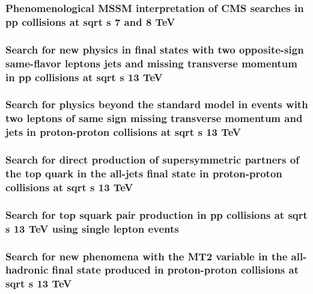 \documentclass[a4paper, 11pt, twoside, openright]{report}
\begin{document}
\subsubsection{Phenomenological MSSM interpretation of CMS searches in pp collisions at sqrt s 7 and 8 TeV}
%
\subsubsection{Search for new physics in final states with two opposite-sign same-flavor leptons jets and missing transverse momentum in pp collisions at sqrt s 13 TeV}
%
\subsubsection{Search for physics beyond the standard model in events with two leptons of same sign missing transverse momentum and jets in proton-proton collisions at sqrt s 13 TeV}
%
\subsubsection{Search for direct production of supersymmetric partners of the top quark in the all-jets final state in proton-proton collisions at sqrt s 13 TeV}
%
\subsubsection{Search for top squark pair production in pp collisions at sqrt s 13 TeV using single lepton events}
%
\subsubsection{Search for new phenomena with the MT2 variable in the all-hadronic final state produced in proton-proton collisions at sqrt s 13 TeV}
%
\end{document}

